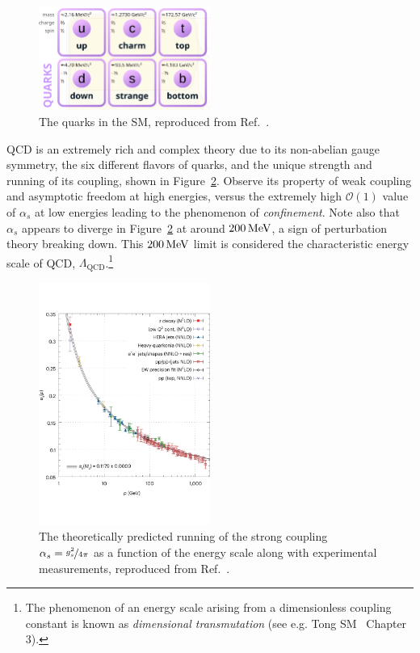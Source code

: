 \begin{figure}[ht]
	\centering
	\captionsetup{justification=centering}
	\includegraphics[width=0.5\textwidth]{figures/01-SM-03-SM/qcd/quarks.png}
	\caption{The quarks in the SM, reproduced from Ref.~\cite{enwiki:1238968997}.}
	\label{fig:01_sm_qcd_quarks}
\end{figure}

QCD is an extremely rich and complex theory due to its non-abelian gauge symmetry, the six different flavors of quarks, and the unique strength and running of its coupling, shown in Figure~\ref{fig:01_sm_qcd_running}.
Observe its property of weak coupling and asymptotic freedom at high energies, versus the extremely high $\mathcal O(1)$ value of $\alpha_s$ at low energies leading to the phenomenon of \textit{confinement}.
Note also that $\alpha_s$ appears to diverge in Figure~\ref{fig:01_sm_qcd_running} at around $200 \,\text{Me\hspace{-.08em}V}$, a sign of perturbation theory breaking down. 
This $200 \,\text{Me\hspace{-.08em}V}$ limit is considered the characteristic energy scale of QCD, $\Lambda_\mathrm{QCD}$.\footnote{The phenomenon of an energy scale arising from a dimensionless coupling constant  is known as \textit{dimensional transmutation} (see e.g. Tong SM~\cite{TongSM} Chapter 3).}

\begin{figure}[ht]
	\centering
	\includegraphics[width=0.5\textwidth]{figures/01-SM-03-SM/qcd/qcd_running}
	\caption{The theoretically predicted running of the strong coupling $\alpha_s = \nicefrac{g_s^2}{4\pi}$ as a function of the energy scale along with experimental measurements, reproduced from Ref.~\cite{Boito:2023lzf}.}
	\label{fig:01_sm_qcd_running}
\end{figure}

